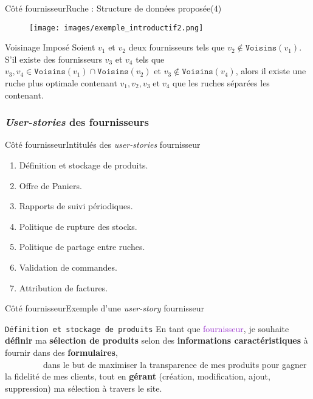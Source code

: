 \documentclass[usenames,dvipsnames]{beamer}
\begin{document}
\begin{frame}{Côté fournisseur}{Ruche : Structure de données proposée($4$)}
\begin{figure}[!ht]
  \centering
  \texttt{[image: images/exemple\_introductif2.png]}
\end{figure}

\begin{block}{Voisinage Imposé}
Soient $v_1$ et $v_2$ deux fournisseurs tels que $v_2 \notin \texttt{Voisins}(v_1)$. S'il existe des fournisseurs $v_3$ et $v_4$ tels que $v_3, v_4 \in \texttt{Voisins}(v_1) \cap \texttt{Voisins}(v_2)$ et $v_3 \notin \texttt{Voisins}(v_4)$, alors il existe une ruche plus optimale contenant $v_1, v_2, v_3\; \text{et}\; v_4$ que les ruches séparées les contenant.
\end{block}
\end{frame}

\subsubsection*{\protect\textit{User-stories} des fournisseurs}
\begin{frame}{Côté fournisseur}{Intitulés des \textit{user-stories} fournisseur}
\begin{enumerate}
  \item Définition et stockage de produits.
  \item Offre de Paniers.
  \item Rapports de suivi périodiques.
  \item Politique de rupture des stocks.
  \item Politique de partage entre ruches.
  \item Validation de commandes.
  \item Attribution de factures.
\end{enumerate}
\end{frame}

\begin{frame}{Côté fournisseur}{Exemple d'une \textit{user-story} fournisseur}
\begin{block}{\textcolor{Sepia}{\texttt{Définition et stockage de produits}}}
En tant que \textcolor{DarkOrchid}{fournisseur}, je souhaite {\color{BrickRed} \textbf{définir} ma \textbf{sélection de produits} selon des \textbf{informations caractéristiques} à fournir dans des \textbf{formulaires}},\\
~~~~~~~~~dans le but de {\color{OliveGreen}maximiser la transparence de mes produits pour gagner la fidelité de mes clients, tout en \textbf{gérant} (création, modification, ajout, suppression) ma sélection à travers le site}.
\end{block}
\end{frame}
\end{document}
